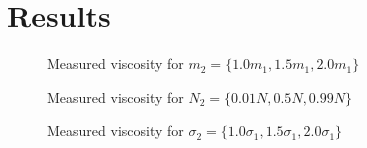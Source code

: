 \chapter{Results}

\begin{figure}[htbp]
    \begin{center}
        
        \caption{
            Measured viscosity for $m_2 = 
            \{1.0m_1, 1.5m_1, 2.0m_1\}$
        }
    \end{center}
\end{figure}
\begin{figure}[htbp]
    \begin{center}
        
        \caption{
            Measured viscosity for $N_2 = 
            \{0.01N, 0.5N, 0.99N\}$
        }
    \end{center}
\end{figure}
\begin{figure}[htbp]
    \begin{center}
        
        \caption{
            Measured viscosity for $\sigma_2 = 
            \{1.0\sigma_1, 1.5\sigma_1, 2.0\sigma_1\}$
        }
    \end{center}
\end{figure}

%        
